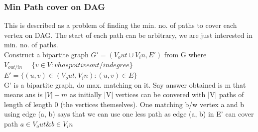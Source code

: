 \documentclass[8pt, a4paper, oneside, twocolumn]{extarticle}
\begin{document}
\subsubsection{Min Path cover on DAG}
This is described as a problem of finding the min. no. of paths to cover each vertex on DAG. The start of each path can be arbitrary, we are just interested in min. no. of paths.
\\Construct a bipartite graph $G' = (V_out \cup V_in, E')$ from G where $V_{out/in} = \{v \in V: v has poitive out/in degree\}$
\\$E' = \{(u, v) \in (V_out, V_in) : (u, v) \in E\}$
\\G' is a bipartite graph, do max. matching on it. Say answer obtained is m that means ans is $|V| - m$ as initially |V| vertices can be convered with |V| paths of length of length 0 (the vertices themselves). One matching b/w vertex a and b using edge (a, b) says that we can use one less path as edge (a, b) in E' can cover path $a \in V_out \& b\in V_in$
\end{document}
